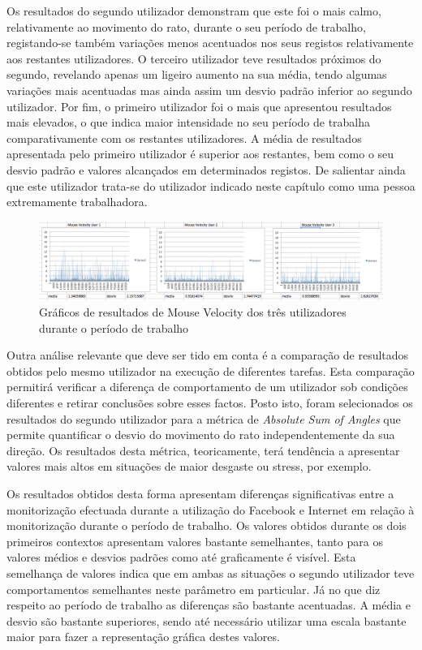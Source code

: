 Os resultados do segundo utilizador demonstram que este foi o mais calmo, relativamente ao movimento do rato, durante o seu período de trabalho, registando-se também variações menos acentuados nos seus registos relativamente aos restantes utilizadores. O terceiro utilizador teve resultados próximos do segundo, revelando apenas um ligeiro aumento na sua média, tendo algumas variações mais acentuadas mas ainda assim um desvio padrão inferior ao segundo utilizador. Por fim, o primeiro utilizador foi o mais que apresentou resultados mais elevados, o que indica maior intensidade no seu período de trabalha comparativamente com os restantes utilizadores. A média de resultados apresentada pelo primeiro utilizador é superior aos restantes, bem como o seu desvio padrão e valores alcançados em determinados registos. De salientar ainda que este utilizador trata-se do utilizador indicado neste capítulo como uma pessoa extremamente trabalhadora.

 \begin{figure}[htb]
   \centering
   \includegraphics[scale=0.3]{Images/mousevelocity.png}
   \caption{Gráficos de resultados de Mouse Velocity dos três utilizadores durante o período de trabalho}
\end{figure}

Outra análise relevante que deve ser tido em conta é a comparação de resultados obtidos pelo mesmo utilizador na execução de diferentes tarefas. Esta comparação permitirá verificar a diferença de comportamento de um utilizador sob condições diferentes e retirar conclusões sobre esses factos. Posto isto, foram selecionados os resultados do segundo utilizador para a métrica de \textit{Absolute Sum of Angles} que permite quantificar o desvio do movimento do rato independentemente da sua direção. Os resultados desta métrica, teoricamente, terá tendência a apresentar valores mais altos em situações de maior desgaste ou stress, por exemplo.

Os resultados obtidos desta forma apresentam diferenças significativas entre a monitorização efectuada durante a utilização do Facebook e Internet em relação à monitorização durante o período de trabalho. Os valores obtidos durante os dois primeiros contextos apresentam valores bastante semelhantes, tanto para os valores médios e desvios padrões como até graficamente é visível. Esta semelhança de valores indica que em ambas as situações o segundo utilizador teve comportamentos semelhantes neste parâmetro em particular. Já no que diz respeito ao período de trabalho as diferenças são bastante acentuadas. A média e desvio são bastante superiores, sendo até necessário utilizar uma escala bastante maior para fazer a representação gráfica destes valores. 

